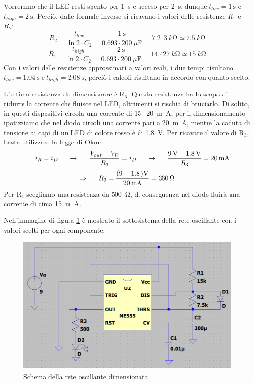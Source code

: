 \documentclass{report}
\begin{document}
Vorremmo che il LED resti spento per \SI{1}{\second} e acceso per \SI{2}{\second}, dunque $\displaystyle{t_{low}=\SI{1}{\second}}$ e $\displaystyle{t_{high}=\SI{2}{\second}}$. Perciò, dalle formule inverse si ricavano i valori delle resistenze $R_1$ e $R_2$:
\\$$R_2 = \frac{t_{low}}{\ln2\cdot C_2}=\frac{\SI{1}{\second}}{0.693\cdot\SI{200}{\mu\farad}}=\SI{7.213}{k\ohm}\simeq\SI{7.5}{k\ohm}$$
$$R_1 = \frac{t_{high}}{\ln2\cdot C_2}=\frac{\SI{2}{\second}}{0.693\cdot\SI{200}{\mu\farad}}=\SI{14.427}{k\ohm}\simeq\SI{15}{k\ohm}$$
Con i valori delle resistenze approssimati a valori reali, i due tempi risultano $\displaystyle{t_{low}=\SI{1.04}{\second}\mathrm{\;e\;}t_{high}=\SI{2.08}{\second}}$, perciò i calcoli risultano in accordo con quanto scelto. \par
L'ultima resistenza da dimensionare è $\mathrm{R_3}$. Questa resistenza ha lo scopo di ridurre la corrente che fluisce nel LED, altrimenti si rischia di bruciarlo. Di solito, in questi dispositivi circola una corrente di 15\SI{-20}{m\ampere}, per il dimensionamento ipotizziamo che nel diodo circoli una corrente pari a \SI{20}{m\ampere}, mentre la caduta di tensione ai capi di un LED di colore rosso è di \SI{1.8}{\volt}. Per ricavare il valore di $\mathrm{R_3}$, basta utilizzare la legge di Ohm:
$$\indent i_R = i_D\indent\rightarrow\indent \frac{V_{out}-V_D}{R_3}=i_D\indent\rightarrow\indent\frac{\SI{9}{\volt}-\SI{1.8}{\volt}}{R_3}=\SI{20}{m\ampere}$$
$$\Rightarrow\indent R_3=\frac{(9\SI{-1.8}{)\volt}}{\SI{20}{m\ampere}}=\SI{360}{\ohm}$$
Per $\mathrm{R_3}$ scegliamo una resistenza da \SI{500}{\ohm}, di conseguenza nel diodo fluirà una corrente di circa \SI{15}{m\ampere}. \par 
Nell'immagine di figura \ref{figura:dim555} è mostrato il sottosistema della rete oscillante con i valori scelti per ogni componente. 
\begin{figure}[h!]
	\centering
	\includegraphics[height=6.9cm]{immagini/dim555}
	\caption{Schema della rete oscillante dimensionata.} 
	\label{figura:dim555}
\end{figure}
\end{document}
